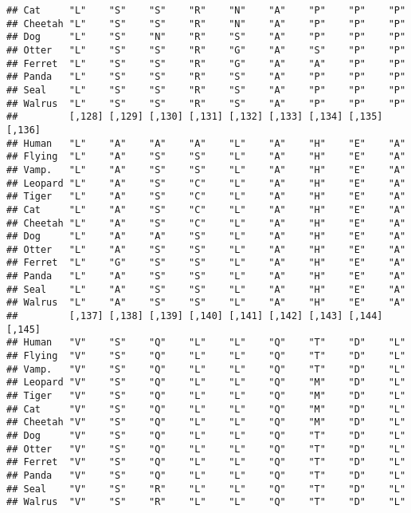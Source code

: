 \documentclass[]{article}
\begin{document}
\begin{verbatim}
## Cat     "L"    "S"    "S"    "R"    "N"    "A"    "P"    "P"    "P"   
## Cheetah "L"    "S"    "S"    "R"    "N"    "A"    "P"    "P"    "P"   
## Dog     "L"    "S"    "N"    "R"    "S"    "A"    "P"    "P"    "P"   
## Otter   "L"    "S"    "S"    "R"    "G"    "A"    "S"    "P"    "P"   
## Ferret  "L"    "S"    "S"    "R"    "G"    "A"    "A"    "P"    "P"   
## Panda   "L"    "S"    "S"    "R"    "S"    "A"    "P"    "P"    "P"   
## Seal    "L"    "S"    "S"    "R"    "S"    "A"    "P"    "P"    "P"   
## Walrus  "L"    "S"    "S"    "R"    "S"    "A"    "P"    "P"    "P"   
##         [,128] [,129] [,130] [,131] [,132] [,133] [,134] [,135] [,136]
## Human   "L"    "A"    "A"    "A"    "L"    "A"    "H"    "E"    "A"   
## Flying  "L"    "A"    "S"    "S"    "L"    "A"    "H"    "E"    "A"   
## Vamp.   "L"    "A"    "S"    "S"    "L"    "A"    "H"    "E"    "A"   
## Leopard "L"    "A"    "S"    "C"    "L"    "A"    "H"    "E"    "A"   
## Tiger   "L"    "A"    "S"    "C"    "L"    "A"    "H"    "E"    "A"   
## Cat     "L"    "A"    "S"    "C"    "L"    "A"    "H"    "E"    "A"   
## Cheetah "L"    "A"    "S"    "C"    "L"    "A"    "H"    "E"    "A"   
## Dog     "L"    "A"    "A"    "S"    "L"    "A"    "H"    "E"    "A"   
## Otter   "L"    "A"    "S"    "S"    "L"    "A"    "H"    "E"    "A"   
## Ferret  "L"    "G"    "S"    "S"    "L"    "A"    "H"    "E"    "A"   
## Panda   "L"    "A"    "S"    "S"    "L"    "A"    "H"    "E"    "A"   
## Seal    "L"    "A"    "S"    "S"    "L"    "A"    "H"    "E"    "A"   
## Walrus  "L"    "A"    "S"    "S"    "L"    "A"    "H"    "E"    "A"   
##         [,137] [,138] [,139] [,140] [,141] [,142] [,143] [,144] [,145]
## Human   "V"    "S"    "Q"    "L"    "L"    "Q"    "T"    "D"    "L"   
## Flying  "V"    "S"    "Q"    "L"    "L"    "Q"    "T"    "D"    "L"   
## Vamp.   "V"    "S"    "Q"    "L"    "L"    "Q"    "T"    "D"    "L"   
## Leopard "V"    "S"    "Q"    "L"    "L"    "Q"    "M"    "D"    "L"   
## Tiger   "V"    "S"    "Q"    "L"    "L"    "Q"    "M"    "D"    "L"   
## Cat     "V"    "S"    "Q"    "L"    "L"    "Q"    "M"    "D"    "L"   
## Cheetah "V"    "S"    "Q"    "L"    "L"    "Q"    "M"    "D"    "L"   
## Dog     "V"    "S"    "Q"    "L"    "L"    "Q"    "T"    "D"    "L"   
## Otter   "V"    "S"    "Q"    "L"    "L"    "Q"    "T"    "D"    "L"   
## Ferret  "V"    "S"    "Q"    "L"    "L"    "Q"    "T"    "D"    "L"   
## Panda   "V"    "S"    "Q"    "L"    "L"    "Q"    "T"    "D"    "L"   
## Seal    "V"    "S"    "R"    "L"    "L"    "Q"    "T"    "D"    "L"   
## Walrus  "V"    "S"    "R"    "L"    "L"    "Q"    "T"    "D"    "L"   

\end{verbatim}
\end{document}
